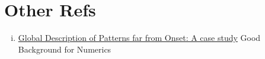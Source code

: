 \documentclass[12pt]{article}
\begin{document}
\section{Other Refs}
\begin{enumerate}[(i)]
    \item \href{https://reader.elsevier.com/reader/sd/pii/S0167278903002173?token=C9ADADC9A05E67C488D5776BD27261885B9517594F4F32DDBFA24510FCC66DC40F1CD86ECEA29C40869C37D271798AEE&originRegion=us-east-1&originCreation=20220903050236}{Global Description of Patterns far from Onset: A case study} Good Background for Numerics
\end{enumerate}
\end{document}
